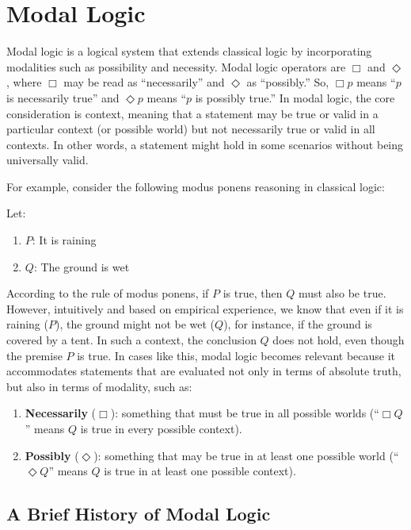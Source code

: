 \documentclass[12pt,a4paper,openany]{article}
\begin{document}
\section{Modal Logic}

Modal logic is a logical system that extends classical logic by incorporating modalities such as possibility and necessity. Modal logic operators are $\Box$ and $\Diamond$, where $\Box$ may be read as ``necessarily'' and $\Diamond$ as ``possibly.'' So, $\Box p$ means ``$p$ is necessarily true'' and $\Diamond p$ means ``$p$ is possibly true.'' In modal logic, the core consideration is context, meaning that a statement may be true or valid in a particular context (or possible world) but not necessarily true or valid in all contexts. In other words, a statement might hold in some scenarios without being universally valid.

For example, consider the following modus ponens reasoning in classical logic:

Let:
\begin{enumerate}
    \item $P$: It is raining
    \item $Q$: The ground is wet
\end{enumerate}

According to the rule of modus ponens, if $P$ is true, then $Q$ must also be true. However, intuitively and based on empirical experience, we know that even if it is raining ($P$), the ground might not be wet ($Q$), for instance, if the ground is covered by a tent. In such a context, the conclusion $Q$ does not hold, even though the premise $P$ is true. In cases like this, modal logic becomes relevant because it accommodates statements that are evaluated not only in terms of absolute truth, but also in terms of modality, such as:

\begin{enumerate}
    \item \textbf{Necessarily} ($\Box$): something that must be true in all possible worlds (``$\Box Q$'' means $Q$ is true in every possible context).
    \item \textbf{Possibly} ($\Diamond$): something that may be true in at least one possible world (``$\Diamond Q$'' means $Q$ is true in at least one possible context).
\end{enumerate}

\subsection{A Brief History of Modal Logic}
\end{document}
